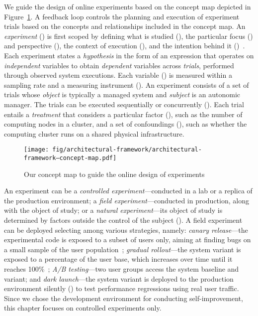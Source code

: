We guide the design of online experiments based on the concept map depicted in Figure~\ref{fig:architectural-framework--concept-map}. A feedback loop controls the planning and execution of experiment trials based on the concepts and relationships included in the concept map. An \emph{experiment} () is first scoped by defining what is studied (), the particular focus () and perspective (), the context of execution (), and the intention behind it ()~\cite{basili-1988-tame,wohlin-2012-experimentation}. Each experiment states a \emph{hypothesis} in the form of an expression that operates on \emph{independent} variables to obtain \emph{dependent} variables across \emph{trials}, performed through observed system executions. Each variable () is measured within a sampling rate and a measuring instrument (). An experiment consists of a set of trials whose \emph{object} is typically a managed system and \emph{subject} is an autonomic manager. The trials can be executed sequentially or concurrently (). Each trial entails a \emph{treatment} that considers a particular factor (), such as the number of computing nodes in a cluster, and a set of confoundings (), such as whether the computing cluster runs on a shared physical infrastructure.

\begin{figure}[h]
	\centering
	\texttt{[image: fig/architectural-framework/architectural-framework--concept-map.pdf]}
	\caption{Our concept map to guide the online design of experiments}
	\label{fig:architectural-framework--concept-map}
\end{figure}

An experiment can be a \emph{controlled experiment}---conducted in a lab or a replica of the production environment; a \emph{field experiment}---conducted in production, along with the object of study; or a \emph{natural experiment}---its object of study is determined by factors outside the control of the subject (). A field experiment can be deployed selecting among various strategies, namely: \emph{canary release}---the experimental code is exposed to a subset of users only, aiming at finding bugs on a small sample of the user population~\cite{humble-2010-continuous}; \emph{gradual rollout}---the system variant is exposed to a percentage of the user base, which increases over time until it reaches 100\%~\cite{humble-2010-continuous}; \emph{A/B testing}---two user groups access the system baseline and variant; and \emph{dark launch}---the system variant is deployed to the production environment silently () to test performance regressions using real user traffic. Since we chose the development environment for conducting self-improvement, this chapter focuses on controlled experiments only.

